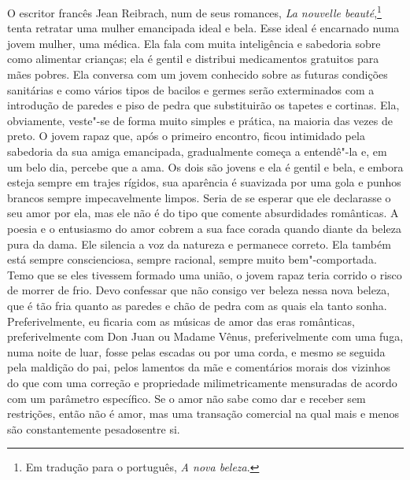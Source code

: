 O escritor francês Jean Reibrach, num de seus romances, \textit{La nouvelle beauté},\footnote{Em tradução para o português, \textit{A nova beleza}.} tenta retratar uma mulher
emancipada ideal e bela. Esse ideal é encarnado numa jovem mulher, uma
médica. Ela fala com muita inteligência e sabedoria sobre como alimentar
crianças; ela é gentil e distribui medicamentos gratuitos para mães
pobres. Ela conversa com um jovem conhecido sobre as futuras condições
sanitárias e como vários tipos de bacilos e germes serão exterminados
com a introdução de paredes e piso de pedra que substituirão os tapetes
e cortinas. Ela, obviamente, veste"-se de forma muito simples e prática,
na maioria das vezes de preto. O jovem rapaz que, após o primeiro
encontro, ficou intimidado pela sabedoria da sua amiga emancipada,
gradualmente começa a entendê"-la e, em um belo dia, percebe que a ama.
Os dois são jovens e ela é gentil e bela, e embora esteja sempre em
trajes rígidos, sua aparência é suavizada por uma gola e punhos brancos
sempre impecavelmente limpos. Seria de se esperar que ele declarasse o
seu amor por ela, mas ele não é do tipo que comente absurdidades
românticas. A poesia e o entusiasmo do amor cobrem a sua face corada
quando diante da beleza pura da dama. Ele silencia a voz da natureza e
permanece correto. Ela também está sempre conscienciosa, sempre
racional, sempre muito bem"-comportada. Temo que se eles tivessem formado
uma união, o jovem rapaz teria corrido o risco de morrer de frio. Devo
confessar que não consigo ver beleza nessa nova beleza, que é tão fria
quanto as paredes e chão de pedra com as quais ela tanto sonha.
Preferivelmente, eu ficaria com as músicas de amor das eras românticas,
preferivelmente com Don Juan ou Madame Vênus, preferivelmente com uma
fuga, numa noite de luar, fosse pelas escadas ou por uma corda, e mesmo
se seguida pela maldição do pai, pelos lamentos da mãe e comentários
morais dos vizinhos do que com uma correção e propriedade
milimetricamente mensuradas de acordo com um parâmetro específico. Se o
amor não sabe como dar e receber sem restrições, então não é amor, mas
uma transação comercial na qual mais e menos são constantemente pesados
​​entre si.

